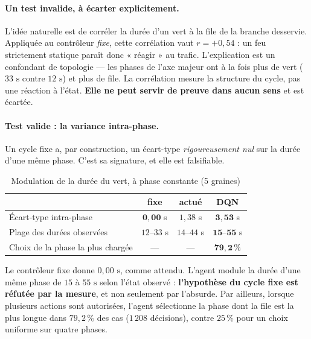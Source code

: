 \documentclass[11pt,a4paper]{article}
\begin{document}
\paragraph{Un test invalide, à écarter explicitement.} L'idée naturelle est de
corréler la durée d'un vert à la file de la branche desservie. Appliquée au
contrôleur \emph{fixe}, cette corrélation vaut $r = +0{,}54$ : un feu strictement
statique paraît donc « réagir » au trafic. L'explication est un confondant de
topologie --- les phases de l'axe majeur ont à la fois plus de vert ($33\text{ s}$
contre $12\text{ s}$) et plus de file. La corrélation mesure la structure du cycle,
pas une réaction à l'état. \textbf{Elle ne peut servir de preuve dans aucun sens} et
est écartée.

\paragraph{Test valide : la variance intra-phase.} Un cycle fixe a, par construction,
un écart-type \emph{rigoureusement nul} sur la durée d'une même phase. C'est sa
signature, et elle est falsifiable.

\begin{table}[H]
\centering
\caption{Modulation de la durée du vert, à phase constante (5 graines)}
\label{tab:adaptivite}
\vspace{0.2cm}
\begin{tabular}{lccc}
\toprule
 & \textbf{fixe} & \textbf{actué} & \textbf{DQN} \\
\midrule
Écart-type intra-phase & $\mathbf{0{,}00}$ s & $1{,}38$ s & $\mathbf{3{,}53}$ s \\
Plage des durées observées & $12$--$33$ s & $14$--$44$ s & $\mathbf{15}$--$\mathbf{55}$ s \\
Choix de la phase la plus chargée & --- & --- & $\mathbf{79{,}2\,\%}$ \\
\bottomrule
\end{tabular}
\end{table}

Le contrôleur fixe donne $0{,}00\text{ s}$, comme attendu. L'agent module la durée
d'une même phase de $15$ à $55\text{ s}$ selon l'état observé : \textbf{l'hypothèse du
cycle fixe est réfutée par la mesure}, et non seulement par l'absurde. Par ailleurs,
lorsque plusieurs actions sont autorisées, l'agent sélectionne la phase dont la file
est la plus longue dans $79{,}2\,\%$ des cas ($1\,208$ décisions), contre $25\,\%$ pour
un choix uniforme sur quatre phases.
\end{document}
